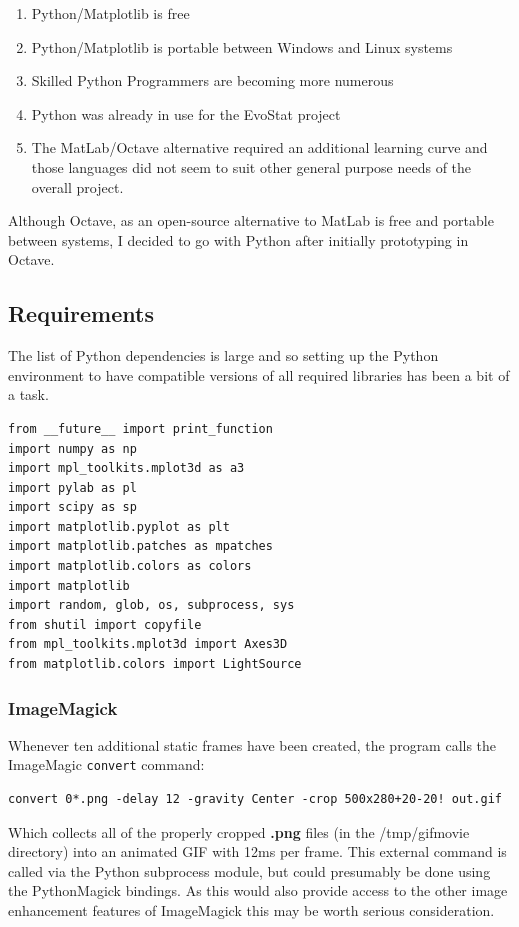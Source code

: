 \documentclass[10pt,letterpaper]{article}
\begin{document}
\begin{enumerate}[itemsep=1pt, topsep=2pt, partopsep=0pt]
\item Python/Matplotlib is free
\item Python/Matplotlib is portable between Windows and Linux systems
\item Skilled Python Programmers are becoming more numerous
\item Python was already in use for the EvoStat project
\item The MatLab/Octave alternative required an additional learning curve and those languages did not seem to suit other general purpose needs of the overall project.
\end{enumerate}
Although Octave, as an open-source alternative to MatLab is free and portable between systems, I decided to go with Python after initially prototyping in Octave.

\subsection*{Requirements}
The list of Python dependencies is large and so setting up the Python environment to have compatible versions of all required libraries has been a bit of a task.
\begin{lstlisting}
from __future__ import print_function
import numpy as np
import mpl_toolkits.mplot3d as a3
import pylab as pl
import scipy as sp
import matplotlib.pyplot as plt
import matplotlib.patches as mpatches
import matplotlib.colors as colors
import matplotlib
import random, glob, os, subprocess, sys
from shutil import copyfile
from mpl_toolkits.mplot3d import Axes3D
from matplotlib.colors import LightSource
\end{lstlisting}
\subsubsection*{ImageMagick}
Whenever ten additional static frames have been created, the program calls the ImageMagic\cite{imagemagick} {\tt convert} command:
\begin{lstlisting}
convert 0*.png -delay 12 -gravity Center -crop 500x280+20-20! out.gif
\end{lstlisting}
Which collects all of the properly cropped {\bf .png} files (in the /tmp/gifmovie directory) into an animated GIF with 12ms per frame.  This external command is called via the Python subprocess module, but could presumably be done using the PythonMagick bindings.  As this would also provide access to the other image enhancement features of ImageMagick this may be worth serious consideration.
\end{document}
